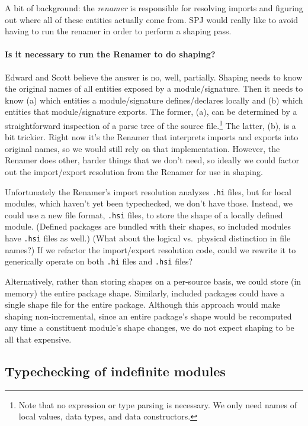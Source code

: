 \documentclass{article}
\begin{document}
A bit of background: the \emph{renamer} is responsible for resolving
imports and figuring out where all of these entities actually come from.
SPJ would really like to avoid having to run the renamer in order to perform
a shaping pass.

\paragraph{Is it necessary to run the Renamer to do shaping?}
Edward and Scott believe the answer is no, well, partially.
Shaping needs to know the original names of all entities exposed by a
module/signature. Then it needs to know (a) which entities a module/signature
defines/declares locally and (b) which entities that module/signature exports.
The former, (a), can be determined by a straightforward inspection of a parse
tree of the source file.\footnote{Note that no expression or type parsing
is necessary. We only need names of local values, data types, and data
constructors.} The latter, (b), is a bit trickier. Right now it's the Renamer
that interprets imports and exports into original names, so we would still
rely on that implementation. However, the Renamer does other, harder things
that we don't need, so ideally we could factor out the import/export
resolution from the Renamer for use in shaping.

Unfortunately the Renamer's import resolution analyzes \verb|.hi| files, but for
local modules, which haven't yet been typechecked, we don't have those.
Instead, we could use a new file format, \verb|.hsi| files, to store the shape of
a locally defined module. (Defined packages are bundled with their shapes,
so included modules have \verb|.hsi| files as well.) (What about the logical
vs.~physical distinction in file names?) If we refactor the import/export
resolution code, could we rewrite it to generically operate on both
\verb|.hi| files and \verb|.hsi| files?

Alternatively, rather than storing shapes on a per-source basis, we could
store (in memory) the entire package shape. Similarly, included packages
could have a single shape file for the entire package. Although this approach
would make shaping non-incremental, since an entire package's shape would
be recomputed any time a constituent module's shape changes, we do not expect
shaping to be all that expensive.

\subsection{Typechecking of indefinite modules}\label{sec:typechecking-indefinite}
\end{document}
